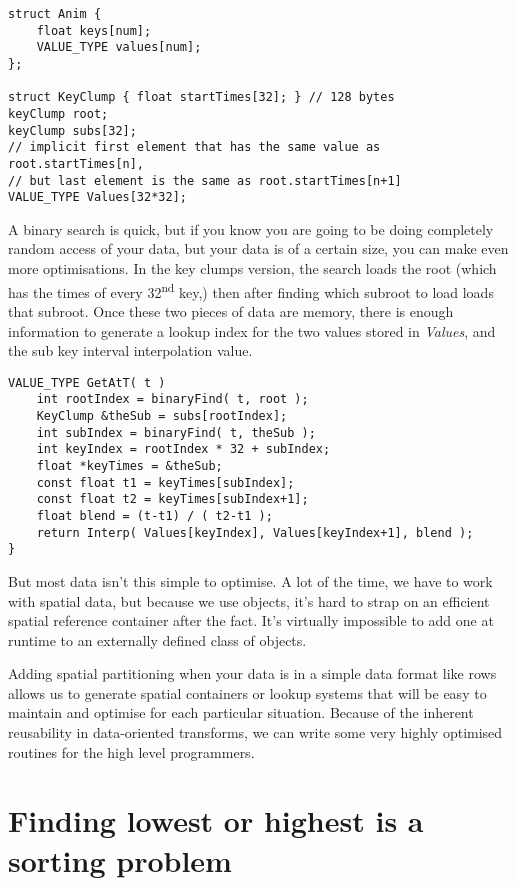\begin{lstlisting}[caption=Anim key formats]
struct Anim {
	float keys[num];
	VALUE_TYPE values[num];
};

struct KeyClump { float startTimes[32]; } // 128 bytes
keyClump root;
keyClump subs[32];
// implicit first element that has the same value as root.startTimes[n],
// but last element is the same as root.startTimes[n+1]
VALUE_TYPE Values[32*32];
\end{lstlisting}

A binary search is quick, but if you know you are going to be doing completely
random access of your data, but your data is of a certain size, you can make
even more optimisations. In the key clumps version, the search loads the root
(which has the times of every 32\textsuperscript{nd} key,) then after finding
which subroot to load loads that subroot. Once these two pieces of data are
memory, there is enough information to generate a lookup index for the two
values stored in {\em Values}, and the sub key interval interpolation value.

\begin{lstlisting}[caption=Finding in the clump]
VALUE_TYPE GetAtT( t ) 
	int rootIndex = binaryFind( t, root );
	KeyClump &theSub = subs[rootIndex];
	int subIndex = binaryFind( t, theSub );
	int keyIndex = rootIndex * 32 + subIndex;
	float *keyTimes = &theSub;
	const float t1 = keyTimes[subIndex];
	const float t2 = keyTimes[subIndex+1];
	float blend = (t-t1) / ( t2-t1 );
	return Interp( Values[keyIndex], Values[keyIndex+1], blend );
}
\end{lstlisting}

But most data isn't this simple to optimise. A lot of the time, we have to work
with spatial data, but because we use objects, it's hard to strap on an
efficient spatial reference container after the fact. It's virtually impossible
to add one at runtime to an externally defined class of objects.

Adding spatial partitioning when your data is in a simple data format like rows
allows us to generate spatial containers or lookup systems that will be easy to
maintain and optimise for each particular situation. Because of the inherent
reusability in data-oriented transforms, we can write some very highly
optimised routines for the high level programmers.

\section[Finding low and high]{Finding lowest or highest is a sorting problem}

